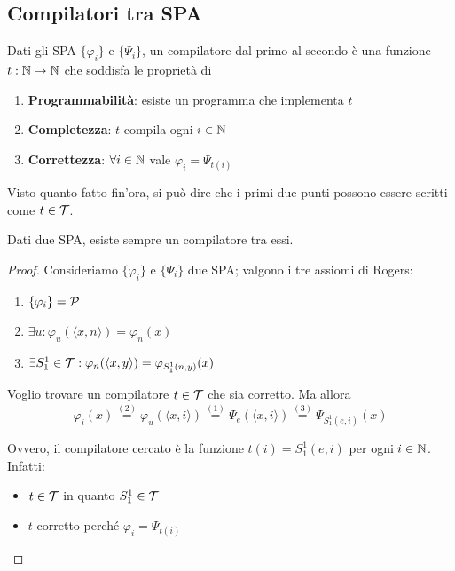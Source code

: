 \subsection{Compilatori tra SPA}

Dati gli SPA $\{\varphi_i\}$ e $\{\Psi_i\}$, un compilatore dal primo al secondo è una funzione $t : \mathbb{N} \rightarrow \mathbb{N}$ che soddisfa le proprietà di
\begin{enumerate}
	\item \textbf{Programmabilità}: esiste un programma che implementa $t$
    
	\item \textbf{Completezza}: $t$ compila ogni $i \in \mathbb{N}$
    
	\item \textbf{Correttezza}: $\forall i \in \mathbb{N}$ vale $\varphi_i = \Psi_{t(i)}$
\end{enumerate}

Visto quanto fatto fin'ora, si può dire che i primi due punti possono essere scritti come $t \in \mathcal{T}$.\\

\begin{theor}
	Dati due SPA, esiste sempre un compilatore tra essi.
\end{theor}
\begin{proof}
	Consideriamo $\{\varphi_i\}$ e $\{\Psi_i\}$ due SPA; valgono i tre assiomi di Rogers:
	\begin{enumerate}
		\item $\{\varphi_i\} = \mathcal{P}$
		
        \item $\exists u: \varphi_u (\langle x,n \rangle) = \varphi_n (x)$
		
        \item $\exists S_1^1 \in \mathcal{T}: \varphi_n (\langle x,y \rangle ) = \varphi_{S^1_1 (n,y)} (x)$
	\end{enumerate}

	Voglio trovare un compilatore $t \in \mathcal{T}$ che sia corretto. Ma allora
	$$ \varphi_i (x) \stackrel{(2)}{=} \varphi_u (\langle x,i \rangle ) \stackrel{(1)}{=} \Psi_e (\langle x,i \rangle) \stackrel{(3)}{=} \Psi_{S_1^1(e,i)} (x) $$

	Ovvero, il compilatore cercato è la funzione $t(i) = S^1_1 (e,i)$ per ogni $i \in \mathbb{N}$. Infatti:
	\begin{itemize}
		\item $t \in \mathcal{T}$ in quanto $S_1^1 \in \mathcal{T}$
		
        \item $t$ corretto perché $\varphi_i = \Psi_{t(i)}$
	\end{itemize}
\end{proof}

